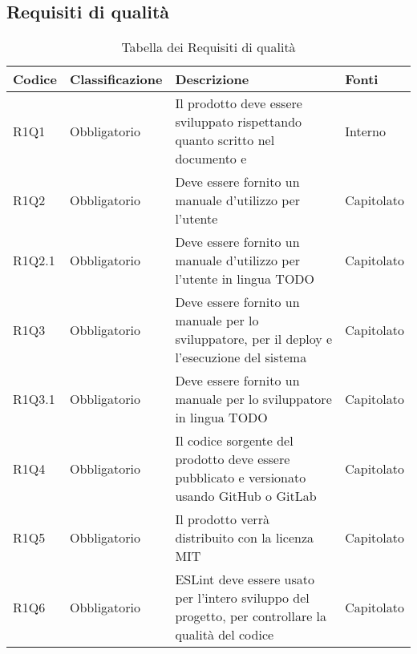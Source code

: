 \subsection{Requisiti di qualità}

{


\centering
\renewcommand{\arraystretch}{2}
\begin{longtable}{C{2.5cm} C{2.8cm} C{6.7cm} C{2.5cm}}
\caption{Tabella dei Requisiti di qualità}\\
\textbf{Codice} &
\textbf{Classificazione}&
\textbf{Descrizione}&
\textbf{Fonti}\\
\endhead


R1Q1 & Obbligatorio & Il prodotto deve essere sviluppato rispettando quanto scritto nel documento  e  & Interno \\
R1Q2 & Obbligatorio & Deve essere fornito un manuale d'utilizzo per l'utente & Capitolato \\
R1Q2.1 & Obbligatorio & Deve essere fornito un manuale d'utilizzo per l'utente in lingua TODO & Capitolato \\
R1Q3 & Obbligatorio & Deve essere fornito un manuale per lo sviluppatore, per il deploy e l'esecuzione del sistema & Capitolato \\
R1Q3.1 & Obbligatorio & Deve essere fornito un manuale per lo sviluppatore in lingua TODO & Capitolato \\
R1Q4 & Obbligatorio & Il codice sorgente del prodotto deve essere pubblicato e versionato usando GitHub o GitLab & Capitolato \\
R1Q5 & Obbligatorio & Il prodotto verrà distribuito con la licenza MIT & Capitolato \\
R1Q6 & Obbligatorio & ESLint deve essere usato per l'intero sviluppo del progetto, per controllare la qualità del codice & Capitolato \\

\end{longtable}

}